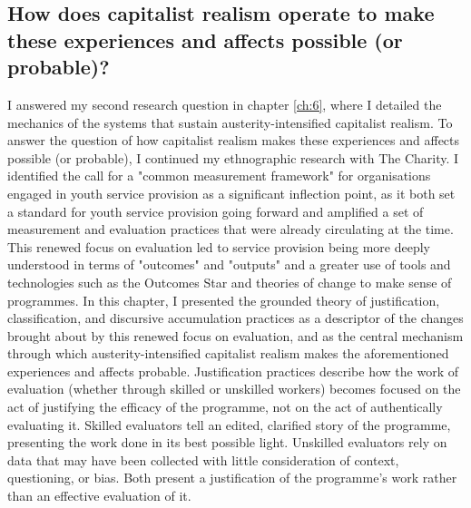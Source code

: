 \subsection{How does capitalist realism operate to make these experiences and affects possible (or probable)?}
\label{subsec:9-2-2}
I answered my second research question in chapter \ref{ch:6}, where I detailed the mechanics of the systems that sustain austerity-intensified capitalist realism. To answer the question of how capitalist realism makes these experiences and affects possible (or probable), I continued my ethnographic research with The Charity. I identified the call for a "common measurement framework" for organisations engaged in youth service provision \citep{house_of_commons_education_committee_services_2011} as a significant inflection point, as it both set a standard for youth service provision going forward and amplified a set of measurement and evaluation practices that were already circulating at the time. This renewed focus on evaluation led to service provision being more deeply understood in terms of "outcomes" and "outputs" and a greater use of tools and technologies such as the Outcomes Star and theories of change to make sense of programmes. In this chapter, I presented the grounded theory of justification, classification, and discursive accumulation practices as a descriptor of the changes brought about by this renewed focus on evaluation, and as the central mechanism through which austerity-intensified capitalist realism makes the aforementioned experiences and affects probable. Justification practices describe how the work of evaluation (whether through skilled or unskilled workers) becomes focused on the act of justifying the efficacy of the programme, not on the act of authentically evaluating it. Skilled evaluators tell an edited, clarified story of the programme, presenting the work done in its best possible light. Unskilled evaluators rely on data that may have been collected with little consideration of context, questioning, or bias. Both present a justification of the programme's work rather than an effective evaluation of it.

